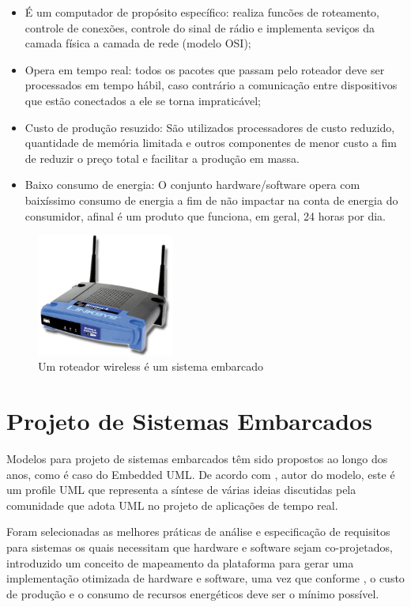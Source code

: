 \begin{itemize}
	\item É um computador de propósito específico: realiza funcões de roteamento, controle de conexões, controle do sinal de rádio e implementa seviços da camada física a camada de rede (modelo OSI);
	\item Opera em tempo real: todos os pacotes que passam pelo roteador deve ser processados em tempo hábil, caso contrário a comunicação entre dispositivos que estão conectados a ele se torna impraticável;
	\item Custo de produção resuzido: São utilizados processadores de custo reduzido, quantidade de memória limitada e outros componentes de menor custo a fim de reduzir o preço total e facilitar a produção em massa.
	\item Baixo consumo de energia: O conjunto hardware/software opera com baixíssimo consumo de energia a fim de não impactar na conta de energia do consumidor, afinal é um produto que funciona, em geral, 24 horas por dia.
\end{itemize}

\begin{figure}[h!]
			\centering
			\includegraphics[width=0.4\textwidth]{figures/embarcado_exemplo.jpg}
			\caption{Um roteador wireless é um sistema embarcado}
			\label{1}
	\end{figure}


\hfill

\section{Projeto de Sistemas Embarcados}

Modelos para projeto de sistemas embarcados têm sido propostos ao longo dos anos, como é caso do Embedded UML. De acordo com \textcite{Martin:2001}, autor do modelo, este é um profile UML que representa a síntese de várias ideias discutidas pela comunidade que adota UML no projeto de aplicações de tempo real. 

Foram selecionadas as melhores práticas de análise e especificação de requisitos para sistemas os quais necessitam que hardware e software sejam co-projetados, introduzido um conceito de mapeamento da plataforma para gerar uma implementação otimizada de hardware e software, uma vez que conforme \textcite{Wolf:2001}, o custo de produção e o consumo de recursos energéticos deve ser o mínimo possível.

